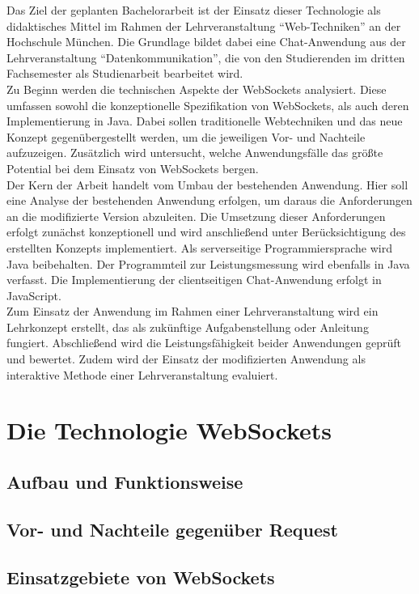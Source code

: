 \documentclass[11pt,a4paper,titlepage]{scrartcl}
\numberwithin{equation}{section}
\begin{document}
\noindent Das Ziel der geplanten Bachelorarbeit ist der Einsatz dieser Technologie als didaktisches Mittel im Rahmen der Lehrveranstaltung “Web-Techniken” an der Hochschule München. Die Grundlage bildet dabei eine Chat-Anwendung aus der Lehrveranstaltung “Datenkommunikation”, die von den Studierenden im dritten Fachsemester als Studienarbeit bearbeitet wird.\\

\noindent Zu Beginn werden die technischen Aspekte der WebSockets analysiert. Diese umfassen sowohl die konzeptionelle Spezifikation von WebSockets, als auch deren Implementierung in Java. Dabei sollen traditionelle Webtechniken und das neue Konzept gegenübergestellt werden, um die jeweiligen Vor- und Nachteile aufzuzeigen. Zusätzlich wird untersucht, welche Anwendungsfälle das größte Potential bei dem Einsatz von WebSockets bergen. \\

\noindent Der Kern der Arbeit handelt vom Umbau der bestehenden Anwendung. Hier soll eine Analyse der bestehenden Anwendung erfolgen, um daraus die Anforderungen an die modifizierte Version abzuleiten. Die Umsetzung dieser Anforderungen erfolgt zunächst konzeptionell und wird anschließend  unter Berücksichtigung des erstellten Konzepts implementiert. Als serverseitige Programmiersprache wird Java beibehalten. Der Programmteil zur Leistungsmessung wird ebenfalls in Java verfasst. Die Implementierung der clientseitigen Chat-Anwendung erfolgt in JavaScript.\\

\noindent Zum Einsatz der Anwendung im Rahmen einer Lehrveranstaltung wird ein Lehrkonzept erstellt, das als zukünftige Aufgabenstellung oder Anleitung fungiert. Abschließend wird die Leistungsfähigkeit beider Anwendungen geprüft und bewertet. Zudem wird der Einsatz der modifizierten Anwendung als interaktive Methode einer Lehrveranstaltung evaluiert.
\section{Die Technologie WebSockets}
\subsection{Aufbau und Funktionsweise}
\subsection{Vor- und Nachteile gegenüber Request}
\subsection{Einsatzgebiete von WebSockets}
\end{document}
